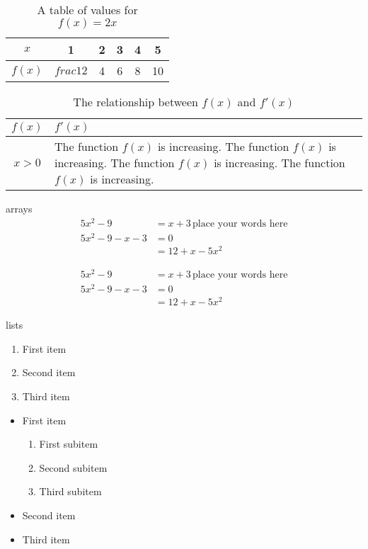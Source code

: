 \documentclass[11pt]{article}
\begin{document}
\begin{table}[H]
\centering
\def\arraystretch{1.2}
\begin{tabular}{|c||c|c|c|c|c|}
\hline
$x$ & 1 & 2 & 3 & 4 & 5 \\ \hline
$f(x)$ & $frac{1}{2}$ & 4 & 6 & 8 & 10 \\ \hline
\end{tabular}
\caption{A table of values for $f(x)=2x$}
\end{table}

\begin{table}[H]
\centering
\def\arraystretch{1.2}
\caption{The relationship between $f(x)$ and $f'(x)$}
\begin{tabular}{|c|p{3in}|}
\hline
$f(x)$ & $f'(x)$ \\ \hline
$x > 0$ & The function $f(x)$ is increasing. The function $f(x)$ is increasing. The function $f(x)$ is increasing. The function $f(x)$ is increasing. \\ \hline
\end{tabular}
\end{table}

arrays
\begin{align}
    5x^2-9 &= x+3 \, \text{place your words here} \\
    5x^2-9 - x - 3 &= 0 \\
    &= 12 + x - 5x^2
\end{align}

\begin{align*}
    5x^2-9 &= x+3 \, \text{place your words here} \\
    5x^2-9 - x - 3 &= 0 \\
    &= 12 + x - 5x^2
\end{align*}


lists
\begin{enumerate}
    \item First item
    \item Second item
    \item Third item
\end{enumerate}

\vspace{1cm}

\begin{itemize}
    \item First item
    \begin{enumerate}
        \item First subitem
        \item Second subitem
        \item Third subitem
    \end{enumerate}
    \item Second item
    \item Third item
\end{itemize}
\end{document}
